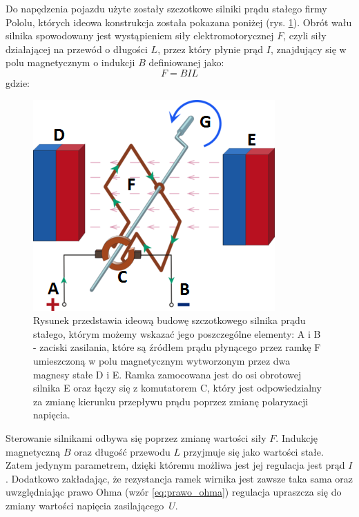Do napędzenia pojazdu użyte zostały szczotkowe silniki prądu stałego firmy Pololu, których ideowa konstrukcja została pokazana poniżej (rys. \ref{silnik_p}). Obrót wału silnika spowodowany jest wystąpieniem siły elektromotorycznej $F$, czyli siły działającej na przewód o długości $L$, przez który płynie prąd $I$, znajdujący się w polu magnetycznym o indukcji $B$ definiowanej jako:
\begin{equation}
	F =  BIL
   \label{eq:sila_elektromotoryczna}
 \end{equation}
 gdzie:  
 \begin{equationDescriptor}
 \end{equationDescriptor}
  \begin{figure}[H]
    \begin{center}
      \includegraphics[scale=0.7]{imgs/silnik_p_stalego.png}
 	\caption[Schemat ideowy silnika prądu stałego.]{\small{Rysunek przedstawia ideową budowę szczotkowego silnika prądu stałego, którym możemy wskazać jego poszczególne elementy: A i B - zaciski zasilania, które są źródłem prądu płynącego przez ramkę F umieszczoną w polu magnetycznym wytworzonym przez dwa magnesy stałe D i E. Ramka zamocowana jest do osi obrotowej silnika E oraz łączy się z komutatorem C, który jest odpowiedzialny za zmianę kierunku przepływu prądu poprzez zmianę polaryzacji napięcia.}\footnotemark}
	\label{silnik_p}
    \end{center}
  \end{figure}  
\noindent
Sterowanie silnikami odbywa się poprzez zmianę wartości siły $F$. Indukcję magnetyczną $B$ oraz długość przewodu $L$ przyjmuje się jako wartości stałe. Zatem jedynym parametrem, dzięki któremu możliwa jest jej regulacja jest prąd $I$. Dodatkowo zakładając, że rezystancja ramek wirnika jest zawsze taka sama oraz uwzględniając prawo Ohma (wzór \ref{eq:prawo_ohma}) regulacja upraszcza się do zmiany wartości napięcia zasilającego~$U$. 
